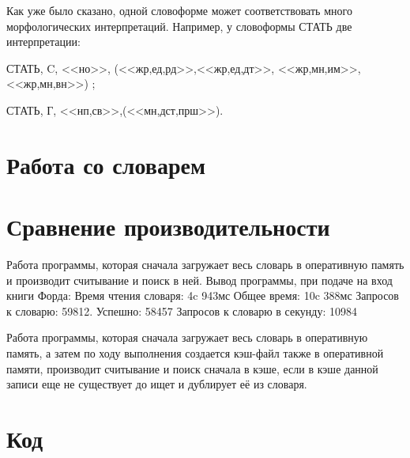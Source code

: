 \documentclass[12pt,a4paper,onecolumn]{report}
\begin{document}
Как уже было сказано, одной словоформе может соответствовать много морфологических интерпретаций. Например, у словоформы СТАТЬ две интерпретации:

{СТАТЬ, C, <<но>>, (<<жр,ед,рд>>,<<жр,ед,дт>>, <<жр,мн,им>>, <<жр,мн,вн>>) };

{СТАТЬ, Г, <<нп,св>>,(<<мн,дст,прш>>)}.
\chapter{Работа со словарем}

\chapter{Сравнение производительности}
Работа программы, которая сначала загружает весь словарь в оперативную память и производит считывание и поиск в ней.
Вывод программы, при подаче на вход книги Форда:
Время чтения словаря: 4c 943мс
Общее время: 10c 388мс
Запросов к словарю: 59812. Успешно: 58457
Запросов к словарю в секунду: 10984

Работа программы, которая сначала загружает весь словарь в оперативную память, а затем по ходу выполнения создается кэш-файл также в оперативной памяти, производит считывание и поиск сначала в кэше, если в кэше данной записи еще не существует до ищет и дублирует её из словаря.

 

\chapter{Код}

\end{document}
